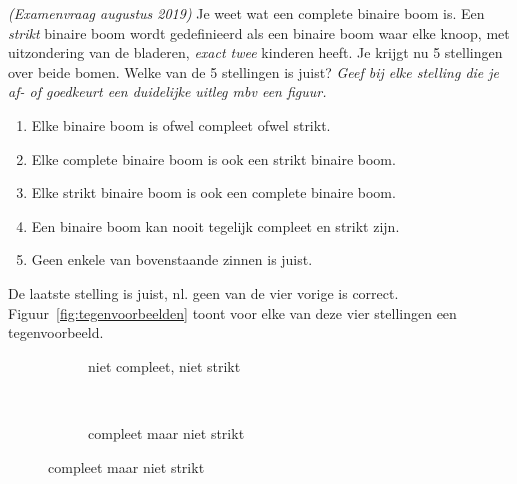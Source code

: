 \begin{oef}\papier \emph{(Examenvraag augustus 2019)}
Je weet wat een complete binaire boom is. Een \emph{strikt} binaire boom wordt gedefinieerd als een binaire boom waar elke knoop, met uitzondering van de bladeren, \emph{exact twee} kinderen heeft. Je krijgt nu 5 stellingen over beide bomen. Welke van de 5 stellingen is juist? \emph{Geef bij elke stelling die je af- of goedkeurt een duidelijke uitleg mbv een figuur.}
\begin{enumerate}
\item Elke binaire boom is ofwel compleet ofwel strikt.
\item Elke complete binaire boom is ook een strikt binaire boom.
\item Elke strikt binaire boom is ook een complete binaire boom.
\item Een binaire boom kan nooit tegelijk compleet en strikt zijn.
\item Geen enkele van bovenstaande zinnen is juist.
\end{enumerate}
\begin{opl}
De laatste stelling is juist, nl. geen van de vier vorige is correct. Figuur~\ref{fig:tegenvoorbeelden} toont voor elke van deze vier stellingen een tegenvoorbeeld.
\begin{figure}[htbp]
    \centering
    \begin{subfigure}[b]{0.45\textwidth}
        \caption{niet compleet, niet strikt}
        \label{fig:nietcompleetnietstrikt}
    \end{subfigure}
    ~ 
       \begin{subfigure}[b]{0.45\textwidth}
        \caption{compleet maar niet strikt}
        \label{fig:compleetnietstrikt}
    \end{subfigure}
    

\end{figure}
\end{opl}
\end{oef}
